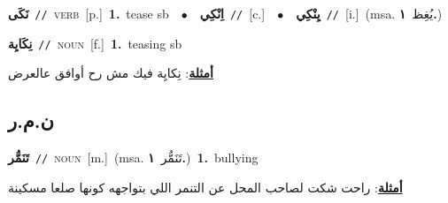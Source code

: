 \documentclass[10pt,a4paper,twoside]{article} %
\begin{document}
\begin{multicols}{2}
{\setlength\topsep{0pt}\textbf{\foreignlanguage{arabic}{نَكَى}}\ {\color{gray}\texttt{//}\color{black}}\ \textsc{verb}\ [p.]\ \textbf{1.}~tease sb\ \ $\bullet$\ \ \setlength\topsep{0pt}\textbf{\foreignlanguage{arabic}{اِنْكِي}}\ {\color{gray}\texttt{//}\color{black}}\ [c.]\ \ $\bullet$\ \ \setlength\topsep{0pt}\textbf{\foreignlanguage{arabic}{يِنْكِي}}\ {\color{gray}\texttt{//}\color{black}}\ [i.]\ \color{gray}(msa. \foreignlanguage{arabic}{يُغِظ}~\foreignlanguage{arabic}{\textbf{١.}})\color{black}\ } \vspace{2mm}

{\setlength\topsep{0pt}\textbf{\foreignlanguage{arabic}{نِكَايِة}}\ {\color{gray}\texttt{//}\color{black}}\ \textsc{noun}\ [f.]\ \textbf{1.}~teasing sb\  \begin{flushright}\color{gray}\foreignlanguage{arabic}{\textbf{\underline{\foreignlanguage{arabic}{أمثلة}}}: نِكايِة فيك مش رح أوافق عالعرض}\end{flushright}\color{black}} \vspace{2mm}

\vspace{-3mm}
\subsection*{\color{blue}\foreignlanguage{arabic}{ن.م.ر}\color{blue}{}} 

{\setlength\topsep{0pt}\textbf{\foreignlanguage{arabic}{تَنَمُّر}}\ {\color{gray}\texttt{//}\color{black}}\ \textsc{noun}\ [m.]\ \color{gray}(msa. \foreignlanguage{arabic}{تَنَمُّر}~\foreignlanguage{arabic}{\textbf{١.}})\color{black}\ \textbf{1.}~bullying\  \begin{flushright}\color{gray}\foreignlanguage{arabic}{\textbf{\underline{\foreignlanguage{arabic}{أمثلة}}}: راحت شكت لصاحب المحل عن التنمر اللي بتواجهه كونها صلعا مسكينة}\end{flushright}\color{black}} \vspace{2mm}


\end{multicols}
\end{document}
